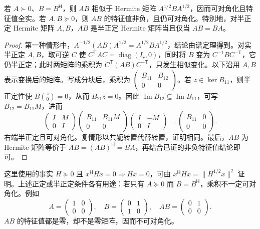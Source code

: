\begin{proposition}
\label{prop:xie-ip-positive-products}
若 $A\succ0$、$B=B^{\mathsf H}$，则 $AB$ 相似于 Hermite 矩阵 $A^{1/2}BA^{1/2}$，因而可对角化且特征值全实。若 $A,B\succeq0$，则 $AB$ 的特征值非负，且仍可对角化。特别地，对半正定 Hermite 矩阵 $A,B$，$AB$ 是半正定 Hermite 矩阵当且仅当 $AB=BA$。
\end{proposition}
\begin{proof}
第一种情形中，$A^{-1/2}(AB)A^{1/2}=A^{1/2}BA^{1/2}$，结论由谱定理得到。对实半正定 $A,B$，取可逆 $C$ 使 $C^{\mathsf T}AC=\operatorname{diag}(I_r,0)$，同时将 $B$ 变为 $C^{-1}BC^{-\mathsf T}$，它仍半正定；此时两矩阵的乘积为 $C^{\mathsf T}(AB)C^{-\mathsf T}$，只发生相似变化。以下沿用 $A,B$ 表示变换后的矩阵。写成分块后，乘积为 $\begin{pmatrix}B_{11}&B_{12}\\0&0\end{pmatrix}$。若 $z\in\ker B_{11}$，则半正定性使 $B\binom{z}{0}=0$，从而 $B_{21}z=0$。因此 $\operatorname{Im}B_{12}\subseteq\operatorname{Im}B_{11}$，可写 $B_{12}=B_{11}M$，进而
\[
\begin{pmatrix}I&M\\0&I\end{pmatrix}
\begin{pmatrix}B_{11}&B_{11}M\\0&0\end{pmatrix}
\begin{pmatrix}I&-M\\0&I\end{pmatrix}
=\begin{pmatrix}B_{11}&0\\0&0\end{pmatrix}.
\]
右端半正定且可对角化。复情形以共轭转置代替转置，证明相同。最后，$AB$ 为 Hermite 矩阵等价于 $AB=(AB)^{\mathsf H}=BA$，再结合已证的非负特征值结论即可。
\end{proof}

这里使用的事实 $H\succeq0$ 且 $x^{\mathsf H}Hx=0\Rightarrow Hx=0$，可由 $x^{\mathsf H}Hx=\|H^{1/2}x\|^2$ 证明。上述正定或半正定条件各有用途：若只有 $A\succeq0$ 而 $B=B^{\mathsf H}$，乘积不一定可对角化。例如
\[
A=\begin{pmatrix}1&0\\0&0\end{pmatrix},\quad
B=\begin{pmatrix}0&1\\1&0\end{pmatrix},\quad
AB=\begin{pmatrix}0&1\\0&0\end{pmatrix}.
\]
$AB$ 的特征值都是零，却不是零矩阵，因而不可对角化。

